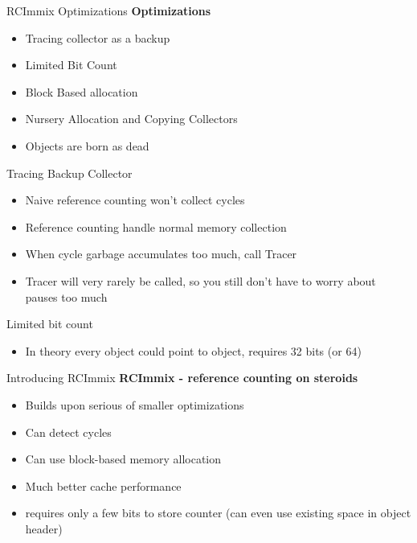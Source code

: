 \documentclass{beamer}
\begin{document}
\begin{frame}{RCImmix Optimizations}
	\textbf{Optimizations}
	\begin{itemize}
		\item Tracing collector as a backup
		\item Limited Bit Count
		\item Block Based allocation
		\item Nursery Allocation and Copying Collectors
		\item Objects are born as dead
	\end{itemize}
\end{frame}

\begin{frame}{Tracing Backup Collector}
	\begin{itemize}
		\item Naive reference counting won't collect cycles
		\item Reference counting handle normal memory collection
		\item When cycle garbage accumulates too much, call Tracer
		\item Tracer will very rarely be called, so you still don't have to worry about pauses too much
	\end{itemize}
\end{frame}

\begin{frame}{Limited bit count}
	\begin{itemize}
		\item In theory every object could point to object, requires 32 bits (or 64)
	\end{itemize}
\end{frame}


\begin{frame}{Introducing RCImmix}
	\textbf{RCImmix - reference counting on steroids}
	\begin{itemize}
		\item Builds upon serious of smaller optimizations
		\item Can detect cycles
		\item Can use block-based memory allocation
		\item Much better cache performance
		\item requires only a few bits to store counter (can even use existing space in object header)
	\end{itemize}
\end{frame}

\addtocounter{section}{1}
\end{document}
